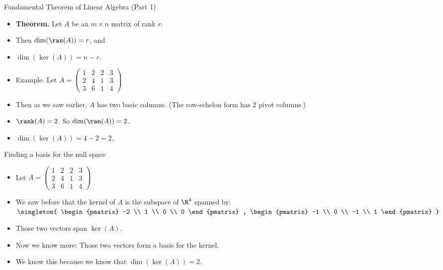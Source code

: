 \documentclass{beamer}
\begin{document}
\begin{frame}{Fundamental Theorem of Linear Algebra (Part 1)}
\begin{itemize}
\item \textbf{Theorem.} Let $A$ be an $m\times n$ matrix of rank $r$.
\item Then $\dim(\ran(A)) = r$, and
\item $\dim(\ker(A)) = n-r$.
\item Example. Let
 $ A =
\begin{pmatrix}
1 & 2 & 2 & 3 \\
2 & 4 & 1 & 3 \\
3 & 6 & 1 & 4
\end{pmatrix}
$
\item Then as we saw earlier, $A$ has two basic columns. (The row-echelon form has 2 pivot columns.)
\item $\rank(A) = 2$. So $\dim(\ran(A)) = 2$.
\item $\dim(\ker(A)) = 4 - 2 =2$.
\end{itemize}
\end{frame}

\begin{frame}{Finding a basis for the null space}

\begin{itemize}
\item Let
$A=
\begin{pmatrix}
1 & 2 & 2 & 3 \\
2 & 4 & 1 & 3 \\
3 & 6 & 1 & 4
\end{pmatrix}
$
\item We saw before that the kernel of $A$ is the subspace of $\R^4$ spanned by:
$
\singleton{
\begin{pmatrix}
-2 \\
1 \\
0 \\
0
\end{pmatrix}
,
\begin{pmatrix}
-1 \\
0 \\
-1 \\
1
\end{pmatrix}
}
$
\item Those two vectors span $\ker(A)$.
\item Now we know more: Those two vectors form a basis for the kernel.
\item We know this because we know that $\dim(\ker(A)) = 2$.
\end{itemize}
\end{frame}
\end{document}
